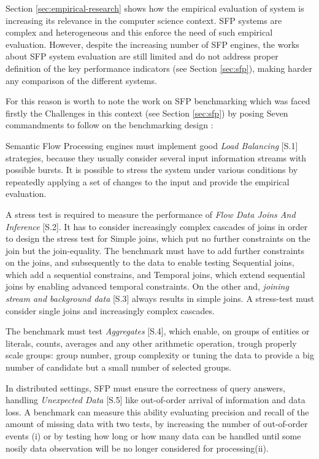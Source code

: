Section \ref{sec:empirical-research} shows how the empirical evaluation of system is increasing its relevance in the computer science context. SFP systems are complex and heterogeneous and this enforce the need of such empirical evaluation. However,  despite the increasing number of SFP engines, the works about SFP system evaluation are still limited and do not address proper definition of the key performance indicators (see Section \ref{sec:sfp}), making harder any comparison of  the different systems.

For this reason is worth to note the work on SFP benchmarking which was faced firstly the Challenges in this context (see Section \ref{sec:sfp}) by posing Seven commandments to follow on the benchmarking design \cite{DBLP:conf/esws/ScharrenbachUMVB13}:

Semantic Flow Processing engines must implement good \textit{Load Balancing} [S.1] strategies, because they usually consider several input information streams with possible bursts. It is possible to stress the system under various conditions by repeatedly applying a set of changes to the input and provide the empirical evaluation.

A stress test is required to measure the performance of \textit{Flow Data Joins And Inference} [S.2]. It has to consider increasingly complex cascades of joins in order to design the stress test for Simple joins, which put no further constraints on the join but the join-equality. The benchmark must have to add further constraints on the joins, and subsequently to  the data to enable testing Sequential joins, which add a sequential constrains, and Temporal joins, which extend sequential joins by enabling advanced temporal constraints. On the other and, \textit{joining stream and background data} [S.3] always results in simple joins. A stress-test must consider single joins and increasingly complex cascades.

The benchmark must test \textit{Aggregates} [S.4], which enable, on groups of entities or literals, counts, averages and any other arithmetic operation, trough properly scale groups: group number, group complexity or tuning the data to provide a big number of candidate but a small number of selected groups.

In distributed settings, SFP must ensure the correctness of query answers, handling \textit{Unexpected Data} [S.5] like out-of-order arrival of information and data loss.  A benchmark can measure this ability evaluating precision and recall of the amount of missing data with two tests, by increasing the number of out-of-order events (i) or by testing how long or how many data can be handled until some nosily data observation will be no longer considered for processing(ii).

